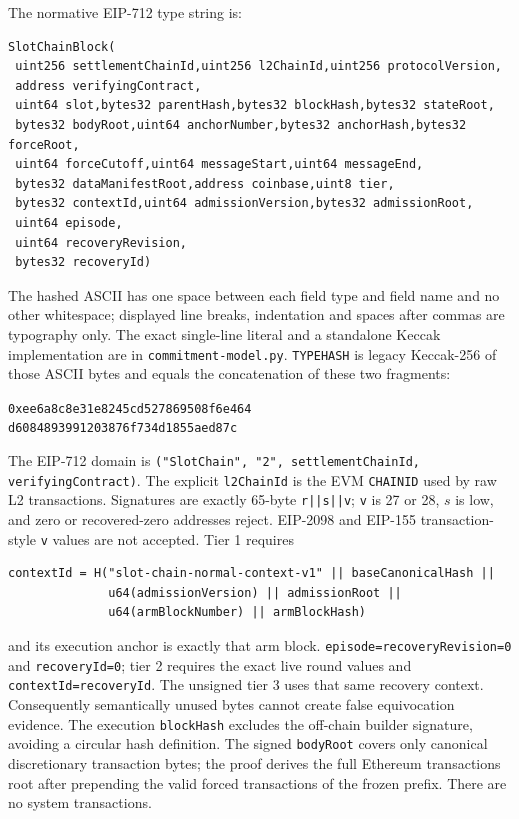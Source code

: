 \documentclass[a4paper,11pt]{article}
\newcommand{\code}[1]{\nolinkurl{#1}}
\begin{document}
The normative EIP-712 type string is:
\begin{verbatim}
SlotChainBlock(
 uint256 settlementChainId,uint256 l2ChainId,uint256 protocolVersion,
 address verifyingContract,
 uint64 slot,bytes32 parentHash,bytes32 blockHash,bytes32 stateRoot,
 bytes32 bodyRoot,uint64 anchorNumber,bytes32 anchorHash,bytes32 forceRoot,
 uint64 forceCutoff,uint64 messageStart,uint64 messageEnd,
 bytes32 dataManifestRoot,address coinbase,uint8 tier,
 bytes32 contextId,uint64 admissionVersion,bytes32 admissionRoot,
 uint64 episode,
 uint64 recoveryRevision,
 bytes32 recoveryId)
\end{verbatim}
The hashed ASCII has one space between each field type and field name and no
other whitespace; displayed line breaks, indentation and spaces after commas
are typography only.  The exact single-line literal and a standalone Keccak
implementation are in \code{commitment-model.py}.
\code{TYPEHASH} is legacy Keccak-256 of those ASCII bytes and equals
the concatenation of these two fragments:
\begin{center}
\code{0xee6a8c8e31e8245cd527869508f6e464}\\
\code{d6084893991203876f734d1855aed87c}
\end{center}
The EIP-712
domain is
\code{("SlotChain", "2", settlementChainId, verifyingContract)}.  The explicit
\code{l2ChainId} is the EVM \code{CHAINID} used by raw L2 transactions.
Signatures
are exactly 65-byte \code{r||s||v}; \code{v} is 27 or 28, $s$ is low, and zero
or recovered-zero addresses reject.  EIP-2098 and EIP-155 transaction-style
\code{v} values are not accepted.  Tier 1 requires
\begin{verbatim}
contextId = H("slot-chain-normal-context-v1" || baseCanonicalHash ||
              u64(admissionVersion) || admissionRoot ||
              u64(armBlockNumber) || armBlockHash)
\end{verbatim}
and its execution anchor is exactly that arm block.
\code{episode=recoveryRevision=0} and \code{recoveryId=0}; tier 2 requires the
exact live round values and \code{contextId=recoveryId}.  The unsigned tier 3
uses that same recovery context.  Consequently semantically unused bytes cannot create
false equivocation evidence.  The execution
\code{blockHash} excludes the off-chain builder signature, avoiding a circular
hash definition.  The signed \code{bodyRoot} covers only canonical discretionary
transaction bytes; the proof derives the full Ethereum transactions root after
prepending the valid forced transactions of the frozen prefix.  There are no
system transactions.
\end{document}
